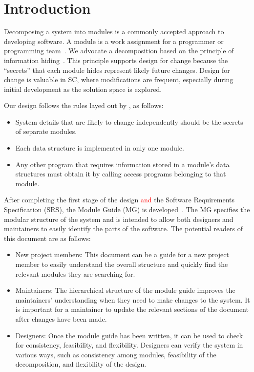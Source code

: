 \documentclass[12pt, titlepage]{article}
\begin{document}
\newpage


\section{Introduction}

Decomposing a system into modules is a commonly accepted approach to developing
software.  A module is a work assignment for a programmer or programming
team~\citep{ParnasEtAl1984}.  We advocate a decomposition
based on the principle of information hiding~\citep{Parnas1972a}.  This
principle supports design for change because the ``secrets'' that each module
hides represent likely future changes.  Design for change is valuable in SC,
where modifications are frequent, especially during initial development as the
solution space is explored.  

\noindent Our design follows the rules layed out by \citet{ParnasEtAl1984}, as follows:
\begin{itemize}
\item System details that are likely to change independently should be the
  secrets of separate modules.
\item Each data structure is implemented in only one module.
\item Any other program that requires information stored in a module's data
  structures must obtain it by calling access programs belonging to that module.
\end{itemize}

\noindent After completing the first stage of the design \textcolor{red}{and} the Software Requirements
Specification (SRS), the Module Guide (MG) is developed~\citep{ParnasEtAl1984}. The MG
specifies the modular structure of the system and is intended to allow both
designers and maintainers to easily identify the parts of the software.  The
potential readers of this document are as follows:

\begin{itemize}
\item New project members: This document can be a guide for a new project member
  to easily understand the overall structure and quickly find the
  relevant modules they are searching for.
\item Maintainers: The hierarchical structure of the module guide improves the
  maintainers' understanding when they need to make changes to the system. It is
  important for a maintainer to update the relevant sections of the document
  after changes have been made.
\item Designers: Once the module guide has been written, it can be used to
  check for consistency, feasibility, and flexibility. Designers can verify the
  system in various ways, such as consistency among modules, feasibility of the
  decomposition, and flexibility of the design.
\end{itemize}
\end{document}
